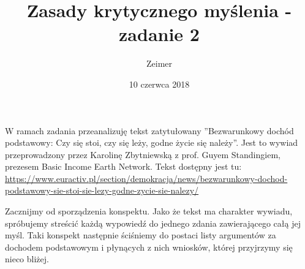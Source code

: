 \documentclass[11pt]{article}
\begin{document}
	\title{Zasady krytycznego myślenia - zadanie 2}
	\author{Zeimer}
	\date{10 czerwca 2018}
	\maketitle
	
	\par W ramach zadania przeanalizuję tekst zatytułowany ''Bezwarunkowy dochód podstawowy: Czy się stoi, czy się leży, godne życie się należy''. Jest to wywiad przeprowadzony przez Karolinę Zbytniewską z prof. Guyem Standingiem, prezesem Basic Income Earth Network. Tekst dostępny jest tu:
	\url{https://www.euractiv.pl/section/demokracja/news/bezwarunkowy-dochod-podstawowy-sie-stoi-sie-lezy-godne-zycie-sie-nalezy/} \\
	
	\par Zacznijmy od sporządzenia konspektu. Jako że tekst ma charakter wywiadu, spróbujemy streścić każdą wypowiedź do jednego zdania zawierającego całą jej myśl. Taki konspekt następnie ściśniemy do postaci listy argumentów za dochodem podstawowym i płynących z nich wniosków, której przyjrzymy się nieco bliżej. \\
	
\end{document}
